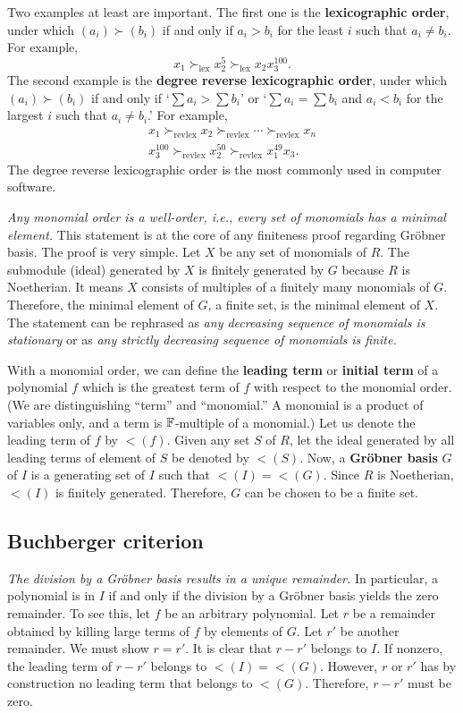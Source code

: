Two examples at least are important. The first one is the {\bf lexicographic order},
under which $(a_i) \succ (b_i)$ if and only if $a_i > b_i$ for the least $i$ such that $a_i \neq b_i$.
For example,
\[
 x_1 \succ_\text{lex} x_2^5 \succ_\text{lex} x_2 x_3^{100} .
\]
The second example is the {\bf degree reverse lexicographic order},
under which $(a_i) \succ (b_i)$ if and only if `$\sum a_i > \sum b_i$' 
or `$\sum a_i = \sum b_i$ and $a_i < b_i$ for the largest $i$ such that $a_i \neq b_i$.'
For example,
\begin{align*}
 x_1 \succ_\text{revlex} x_2 \succ_\text{revlex} \cdots \succ_\text{revlex} x_n \\
 x_3^{100} \succ_\text{revlex} x_2^{50} \succ_\text{revlex} x_1^{49} x_3 .
\end{align*}
The degree reverse lexicographic order is the most commonly used in computer software.


{\em Any monomial order is a well-order, i.e., every set of monomials has a minimal element.}
This statement is at the core of any finiteness proof regarding Gr\"obner basis.
The proof is very simple. Let $X$ be any set of monomials of $R$.
The submodule (ideal) generated by $X$ is finitely generated by $G$ because $R$ is Noetherian.
It means $X$ consists of multiples of a finitely many monomials of $G$.
Therefore, the minimal element of $G$, a finite set, is the minimal element of $X$.
The statement can be rephrased as {\em any decreasing sequence of monomials is stationary}
or as {\em any strictly decreasing sequence of monomials is finite.}


With a monomial order, we can define the {\bf leading term} or {\bf initial term} of a polynomial $f$
which is the greatest term of $f$ with respect to the monomial order.
(We are distinguishing ``term'' and ``monomial.'' A monomial is a product of variables only, and a term is $\mathbb{F}$-multiple of a monomial.)
Let us denote the leading term of $f$ by $\lt(f)$.
Given any set $S$ of $R$, let the ideal generated by all leading terms of element of $S$ be denoted by $\lt(S)$.
Now, a {\bf Gr\"obner basis} $G$ of $I$ is a generating set of $I$ such that $\lt(I) = \lt(G)$.
Since $R$ is Noetherian, $\lt(I)$ is finitely generated.
Therefore, $G$ can be chosen to be a finite set.

\subsection*{Buchberger criterion}

{\em The division by a Gr\"obner basis results in a unique remainder.}
In particular, a polynomial is in $I$ if and only if the division by a Gr\"obner basis yields the zero remainder.
To see this, let $f$ be an arbitrary polynomial.
Let $r$ be a remainder obtained by killing large terms of $f$ by elements of $G$.
Let $r'$ be another remainder. We must show $r = r'$.
It is clear that $r-r'$ belongs to $I$. If nonzero, the leading term of $r-r'$ belongs to $\lt(I) = \lt(G)$.
However, $r$ or $r'$ has by construction no leading term that belongs to $\lt(G)$.
Therefore, $r-r'$ must be zero.


